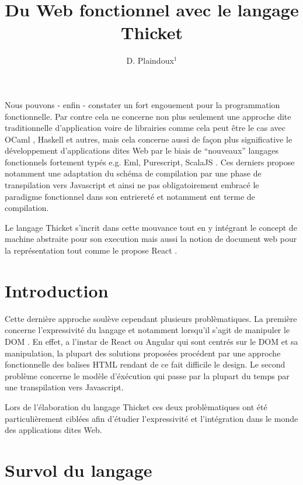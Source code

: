 \documentclass[twoside,a4paper]{article}
\title{ Du Web fonctionnel avec le langage Thicket }
\author{D. Plaindoux$^1$}
\affiliation{\begin{tabular}{rr} 
    \\ 1:  Fungus, Le village 31430 Gratens, France
    \\     {\tt d.plaindoux@fungus.fr}
\end{tabular}}
\begin{document}
\setcounter{page}{1}
\maketitle

Nous  pouvons  -  enfin  -   constater  un  fort  engouement  pour  la
programmation  fonctionnelle.  Par  contre cela  ne concerne  non plus
seulement  une approche  dite  traditionnelle  d'application voire  de
librairies  comme  cela peut  être  le  cas avec  OCaml  \cite{OCaml},
Haskell \cite{Haskell}  et autres, mais  cela concerne aussi  de façon
plus significative  le développement  d'applications dites Web  par le
biais  de  ``nouveaux''  langages fonctionnels  fortement  typés  e.g.
Eml\cite{eml},  Purescript\cite{purescript},  ScalaJS  \cite{scalajs}.
Ces derniers propose notamment une adaptation du schéma de compilation
par une  phase de  transpilation vers Javascript  \cite{javascript} et
ainsi ne pas obligatoirement embracé le paradigme fonctionnel dans son
entriereté et notamment ent terme de compilation.

Le langage Thicket s'incrit dans cette mouvance tout en y intégrant le
concept de machine  abstraite pour son execution mais  aussi la notion
de document  web pour  la représentation tout  comme le  propose React
\cite{React}.

\section{Introduction}

Cette dernière approche soulève cependant plusieurs problèmatiques. La
première  concerne l'expressivité  du langage  et notamment  lorsqu'il
s'agit de manipuler  le DOM \cite{dom}. En effet, a  l'instar de React
\cite{reacjs} ou Angular  \cite{angular2} qui sont centrés  sur le DOM
et sa manipulation,  la plupart des solutions  proposées procédent par
une  approche  fonctionnelle  des  balises HTML  rendant  de  ce  fait
difficile le design. Le second problème concerne le modèle d'éxécution
qui  passe  par  la  plupart  du  temps  par  une  transpilation  vers
Javascript.

Lors de l'élaboration  du langage Thicket ces  deux problèmatiques ont
été   particulièrement  ciblées   afin  d'étudier   l'expressivité  et
l'intégration dans le monde des applications dites Web.

\section{Survol du langage}
\end{document}
